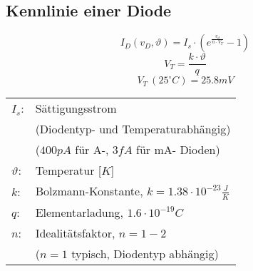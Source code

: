 



\subsection{Kennlinie einer Diode}
\[ I_D(v_D, \vartheta) = I_s \cdot \left(e^{\frac{v_d}{n \cdot V_T}} - 1\right) \]
\[ V_T = \frac{k \cdot \vartheta}{q} \]
\[ V_T~(25^\circ C) = 25.8 mV \]
\begin{tabular}{@{}ll}
  $I_s$:        & Sättigungsstrom \\
                & (Diodentyp- und Temperaturabhängig) \\
                & ($400 pA$ für A-, $3 fA$ für mA- Dioden) \\
  $\vartheta$:  & Temperatur [$K$] \\
  $k$:          & Bolzmann-Konstante, $k=1.38 \cdot 10^{-23} \frac{J}{K}$ \\
  $q$:          & Elementarladung, $1.6 \cdot 10^{-19} C$ \\
  $n$:          & Idealitätsfaktor, $n = 1-2$ \\
                & ($n = 1$ typisch, Diodentyp abhängig)
\end{tabular}